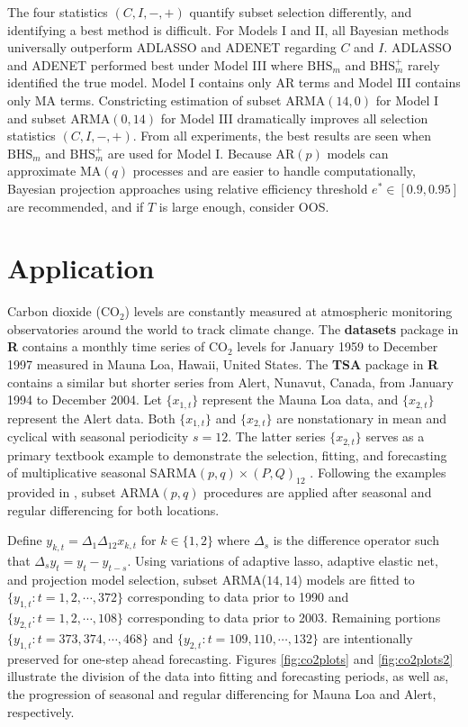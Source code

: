 The four statistics $(C,I,-,+)$ quantify subset selection differently, and identifying a best method is difficult. For Models I and II, all Bayesian methods universally outperform ADLASSO and ADENET regarding $C$ and $I$. ADLASSO and ADENET performed best under Model III where $\textrm{BHS}_m$ and $\textrm{BHS}^+_m$ rarely identified the true model. Model I contains only AR terms and Model III contains only MA terms. Constricting estimation of subset ARMA$(14,0)$ for Model I and subset ARMA$(0,14)$ for Model III dramatically improves all selection statistics $(C,I,-,+)$. From all experiments, the best results are seen when $\textrm{BHS}_m$ and $\textrm{BHS}^+_m$ are used for Model I. Because AR$(p)$ models can approximate MA$(q)$ processes and are easier to handle computationally, Bayesian projection approaches using relative efficiency threshold $e^*\in [0.9,0.95]$ are recommended, and if $T$ is large enough, consider OOS. 










\section{Application}
\label{sec:co2app}
Carbon dioxide ($\textrm{CO}_2$) levels are constantly measured at atmospheric monitoring observatories around the world to track climate change. The {\bf datasets} package in {\bf R} \citep{RCORETEAM} contains a monthly time series of  $\textrm{CO}_2$ levels for January 1959 to December 1997 measured in Mauna Loa, Hawaii, United States. The {\bf TSA} package in {\bf R} \citep{RTSA} contains a similar but shorter series  from Alert, Nunavut, Canada, from January 1994 to December 2004. Let $\{x_{1,t}\}$ represent the Mauna Loa data, and $\{x_{2,t}\}$ represent the Alert data. Both $\{x_{1,t}\}$ and $\{x_{2,t}\}$ are nonstationary in mean and cyclical with seasonal periodicity $s=12$. The latter series $\{x_{2,t}\}$ serves as a primary textbook example  to demonstrate the selection, fitting, and forecasting of multiplicative seasonal SARMA$(p,q)\times(P,Q)_{12}$ \citep[pp. 227-245]{Cryer2008}. Following the examples provided in \cite{Cryer2008,Chen2011}, subset ARMA$(p,q)$ procedures are applied after seasonal and regular differencing for both locations. 

Define $y_{k,t}=\Delta_1\Delta_{12}x_{k,t}$ for $k\in\{1,2\}$  where $\Delta_s$ is the difference operator such that $\Delta_s y_t=y_t-y_{t-s}$.  Using variations of adaptive lasso, adaptive elastic net, and projection model selection, subset ARMA($14,14$) models are fitted to $\{y_{1,t}:t=1,2,\cdots,372\}$ corresponding to data prior to 1990 and $\{y_{2,t}:t=1,2,\cdots,108\}$ corresponding to data prior to 2003. Remaining portions $\{y_{1,t}:t=373,374,\cdots,468\}$ and $\{y_{2,t}:t=109,110,\cdots,132\}$ are intentionally preserved for one-step ahead forecasting. Figures \ref{fig:co2plots} and \ref{fig:co2plots2} illustrate the division of the data into fitting and forecasting periods, as well as, the progression of seasonal and regular differencing for Mauna Loa and Alert, respectively.

